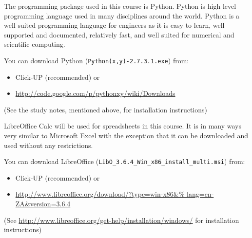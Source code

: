         The programming package used in this course is Python. Python is
        high level programming language used in many disciplines around the 
        world. Python is a well suited programming language for engineers as 
        it is easy to learn, well supported and documented, relatively fast, 
        and well suited for numerical and scientific computing.
        
        You can download Python ({\tt Python(x,y)-2.7.3.1.exe}) from:
        \begin{itemize}
            \item Click-UP (recommended) or
            \item \url{http://code.google.com/p/pythonxy/wiki/Downloads}
        \end{itemize}
        (See the study notes, mentioned above, for installation instructions)

        LibreOffice Calc will be used for spreadsheets in this course. It is 
        in many ways very similar to Microsoft Excel with the exception 
        that it can be downloaded and used without any restrictions.
        
        You can download LibreOffice 
        ({\tt LibO\_3.6.4\_Win\_x86\_install\_multi.msi}) from:
        \begin{itemize}
            \item Click-UP (recommended) or
            \item \url{http://www.libreoffice.org/download/?type=win-x86&%
                       lang=en-ZA&version=3.6.4}
        \end{itemize}
        (See \url{http://www.libreoffice.org/get-help/installation/windows/} for 
         installation instructions)
